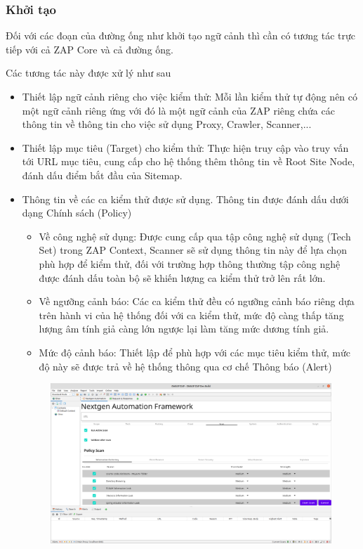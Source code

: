 \documentclass[./../main.tex]{subfiles}
\begin{document}
\subsubsection{Khởi tạo}

Đối với các đoạn của đường ống như khởi tạo ngữ cảnh thì cần có tương
tác trực tiếp với cả ZAP Core và cả đường ống.

Các tương tác này được xử lý như sau
\begin{itemize}
	\item Thiết lập ngữ cảnh riêng cho việc kiểm thử: Mỗi lần kiểm
	      thử tự động nên có một ngữ cảnh riêng ứng với đó là một ngữ cảnh
	      của ZAP riêng chứa các thông tin về thông tin cho việc sử dụng Proxy,
	      Crawler, Scanner,...
	\item Thiết lập mục tiêu (Target) cho kiểm thử: Thực hiện truy cập
	      vào truy vấn tới URL mục tiêu, cung cấp cho hệ thống thêm thông tin
	      về Root Site Node, đánh dấu điểm bắt đầu của Sitemap.
	\item Thông tin về các ca kiểm thử được sử dụng. Thông tin được
	      đánh dấu dưới dạng Chính sách (Policy)
	      \begin{itemize}
		      \item Về công nghệ sử dụng: Được cung cấp qua tập công
		            nghệ sử dụng (Tech Set) trong ZAP Context, Scanner sẽ
		            sử dụng thông tin này để lựa chọn phù hợp để kiểm thử,
		            đối với trường hợp thông thường tập công nghệ được
		            đánh dấu toàn bộ sẽ khiến lượng ca kiểm thử trở lên rất lớn.
		      \item Về ngưỡng cảnh báo: Các ca kiểm thử đều có ngưỡng
		            cảnh báo riêng dựa trên hành vi của hệ thống đối với ca
		            kiểm thử, mức độ càng thấp tăng lượng âm tính giả càng
		            lớn ngược lại làm tăng mức dương tính giả.
		      \item Mức độ cảnh báo: Thiết lập để phù hợp với các mục
		            tiêu kiểm thử, mức độ này sẽ được trả về hệ thống thông
		            qua cơ chế Thông báo (Alert)
	      \end{itemize}
	      \begin{figure}[H]
		      \includegraphics[width=\linewidth]{./images/policy.png}

\end{figure}
\end{itemize}
\end{document}
